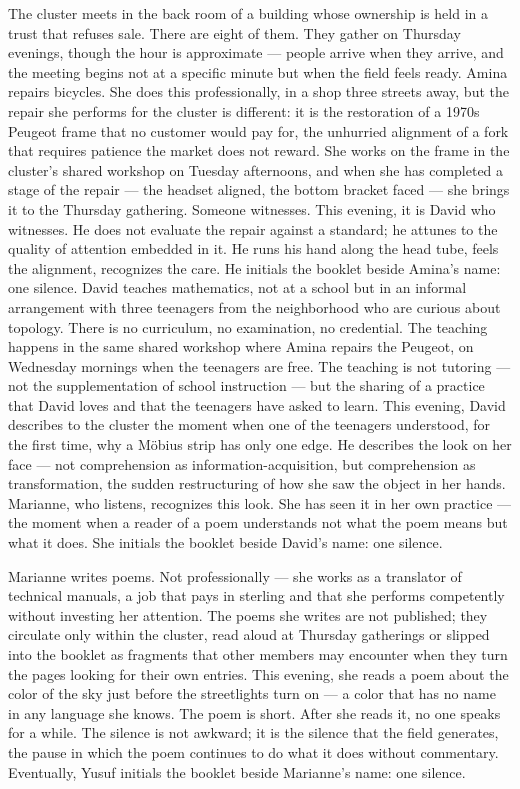 The cluster meets in the back room of a building whose ownership is held in a trust that refuses sale. There are eight of them. They gather on Thursday evenings, though the hour is approximate — people arrive when they arrive, and the meeting begins not at a specific minute but when the field feels ready. Amina repairs bicycles. She does this professionally, in a shop three streets away, but the repair she performs for the cluster is different: it is the restoration of a 1970s Peugeot frame that no customer would pay for, the unhurried alignment of a fork that requires patience the market does not reward. She works on the frame in the cluster’s shared workshop on Tuesday afternoons, and when she has completed a stage of the repair — the headset aligned, the bottom bracket faced — she brings it to the Thursday gathering. Someone witnesses. This evening, it is David who witnesses. He does not evaluate the repair against a standard; he attunes to the quality of attention embedded in it. He runs his hand along the head tube, feels the alignment, recognizes the care. He initials the booklet beside Amina’s name: one silence. David teaches mathematics, not at a school but in an informal arrangement with three teenagers from the neighborhood who are curious about topology. There is no curriculum, no examination, no credential. The teaching happens in the same shared workshop where Amina repairs the Peugeot, on Wednesday mornings when the teenagers are free. The teaching is not tutoring — not the supplementation of school instruction — but the sharing of a practice that David loves and that the teenagers have asked to learn. This evening, David describes to the cluster the moment when one of the teenagers understood, for the first time, why a Möbius strip has only one edge. He describes the look on her face — not comprehension as information-acquisition, but comprehension as transformation, the sudden restructuring of how she saw the object in her hands. Marianne, who listens, recognizes this look. She has seen it in her own practice — the moment when a reader of a poem understands not what the poem means but what it does. She initials the booklet beside David’s name: one silence.

Marianne writes poems. Not professionally --- she works as a translator of technical manuals, a job that pays in sterling and that she performs competently without investing her attention. The poems she writes are not published; they circulate only within the cluster, read aloud at Thursday gatherings or slipped into the booklet as fragments that other members may encounter when they turn the pages looking for their own entries. This evening, she reads a poem about the color of the sky just before the streetlights turn on --- a color that has no name in any language she knows. The poem is short. After she reads it, no one speaks for a while. The silence is not awkward; it is the silence that the field generates, the pause in which the poem continues to do what it does without commentary. Eventually, Yusuf initials the booklet beside Marianne's name: one silence.

